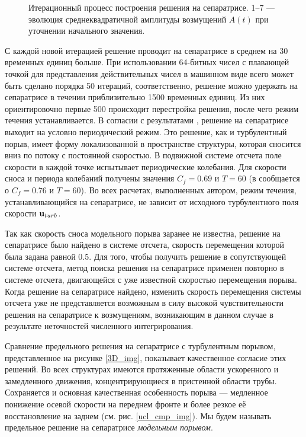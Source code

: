 \begin{figure}[h]
\caption{Итерационный процесс построения решения на сепаратрисе. 1--7 --- эволюция среднеквадратичной амплитуды возмущений $A(t)$ при уточнении начального
значения.}
\label{bisection_pic}
\end{figure}

С каждой новой итерацией решение проводит на сепаратрисе в среднем на 30 временных единиц больше. При использовании 64-битных чисел с плавающей точкой для представления действительных чисел в машинном виде всего может быть сделано порядка 50 итераций, соответственно, решение можно удержать на сепаратрисе в течении приблизительно 1500 временных единиц. Из них ориентировочно первые 500 происходит перестройка решения, после чего режим течения устанавливается. В согласии с результатами \cite{Avila2013}, решение на сепаратрисе выходит на условно периодический режим. Это решение, как и турбулентный порыв, имеет форму локализованной в пространстве структуры, которая сносится вниз по потоку с постоянной скоростью. В подвижной системе отсчета поле скорости в каждой точке испытывает периодические колебания. Для скорости сноса и периода колебаний получены значения $C_f=0.69$ и $T=60$ (в \cite{Avila2013} сообщается о $C_f=0.76$ и $T=60$). Во всех расчетах, выполненных автором, режим течения, устанавливающийся на сепаратрисе, не зависит от исходного турбулентного поля скорости $\mathbf{u}_{turb}$. 

Так как скорость сноса модельного порыва заранее не известна, решение на сепаратрисе было найдено в системе отсчета, скорость перемещения которой была задана равной $0.5$. Для того, чтобы получить решение в сопутствующей системе отсчета, метод поиска решения на сепаратрисе применен повторно в системе отсчета, двигающейся с уже известной скоростью перемещения порыва. Когда решение на сепаратрисе найдено, изменить скорость перемещения системы отсчета уже не представляется возможным в силу высокой чувствительности решения на сепаратрисе к возмущениям, возникающим в данном случае в результате неточностей численного интегрирования. 


Сравнение предельного решения на сепаратрисе с турбулентным порывом, представленное на рисунке \ref{3D_img}, показывает качественное согласие этих решений. Во всех структурах имеются протяженные области ускоренного и замедленного движения, концентрирующиеся в пристенной области трубы. Сохраняется и основная качественная особенность порыва --- медленное понижение осевой скорости на переднем фронте и более резкое её восстановление на заднем (см. рис. \ref{ucl_cmp_img}). Мы будем называть предельное решение на сепаратрисе {\it модельным порывом}.  

